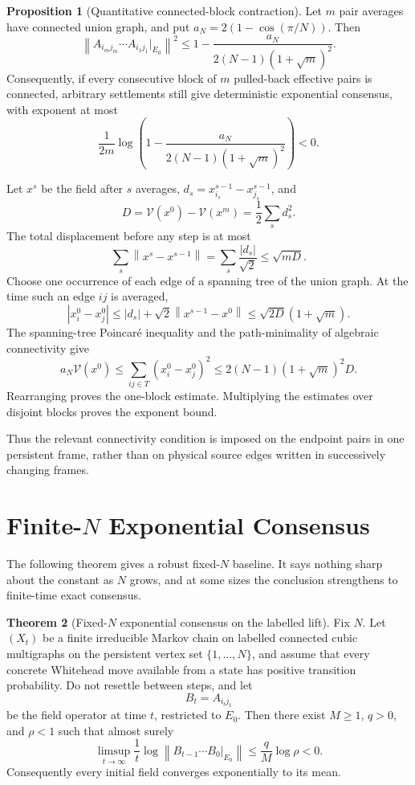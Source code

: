 \documentclass[11pt]{article}
\makeatletter
\newcommand{\V}{\mathcal V}
\newcommand{\norm}[1]{\left\|#1\right\|}
\theoremstyle{definition}
\newtheorem{theorem}{Theorem}
\newtheorem{proposition}[theorem]{Proposition}
\renewenvironment{proof}[1][\proofname]{\par
  \pushQED{\qed}%
  \normalfont \topsep6\p@\@plus6\p@\relax
  \trivlist
  \item[\hskip\labelsep\bfseries #1\@addpunct{.}]\ignorespaces
}{%
  \popQED\endtrivlist\@endpefalse
}
\makeatother
\begin{document}
\begin{proposition}[Quantitative connected-block contraction]
Let $m$ pair averages have connected union graph, and put
$a_N=2(1-\cos(\pi/N))$.  Then
\[
 \norm{A_{i_mj_m}\cdots A_{i_1j_1}|_{E_0}}^2
 \le
 1-\frac{a_N}{2(N-1)(1+\sqrt m)^2}.
\]
Consequently, if every consecutive block of $m$ pulled-back effective pairs
is connected, arbitrary settlements still give deterministic exponential
consensus, with exponent at most
\[
 \frac1{2m}\log\left(
 1-\frac{a_N}{2(N-1)(1+\sqrt m)^2}\right)<0.
\]
\end{proposition}

\begin{proof}
Let $x^s$ be the field after $s$ averages,
$d_s=x^{s-1}_{i_s}-x^{s-1}_{j_s}$, and
\[
 D=\V(x^0)-\V(x^m)=\frac12\sum_s d_s^2.
\]
The total displacement before any step is at most
\[
 \sum_s\norm{x^s-x^{s-1}}
 =\sum_s\frac{|d_s|}{\sqrt2}\le\sqrt{mD}.
\]
Choose one occurrence of each edge of a spanning tree of the union graph.
At the time such an edge $ij$ is averaged,
\[
 |x_i^0-x_j^0|
 \le |d_s|+\sqrt2\norm{x^{s-1}-x^0}
 \le\sqrt{2D}(1+\sqrt m).
\]
The spanning-tree Poincar\'e inequality and the path-minimality of algebraic
connectivity give
\[
 a_N\V(x^0)
 \le\sum_{ij\in T}(x_i^0-x_j^0)^2
 \le2(N-1)(1+\sqrt m)^2D.
\]
Rearranging proves the one-block estimate.  Multiplying the estimates over
disjoint blocks proves the exponent bound.
\end{proof}

Thus the relevant connectivity condition is imposed on the endpoint pairs
in one persistent frame, rather than on physical source edges written in
successively changing frames.

\section{\texorpdfstring{Finite-$N$}{Finite-N} Exponential Consensus}

The following theorem gives a robust fixed-$N$ baseline.  It says nothing sharp
about the constant as $N$ grows, and at some sizes the conclusion strengthens
to finite-time exact consensus.

\begin{theorem}[Fixed-$N$ exponential consensus on the labelled lift]
Fix $N$.  Let $(X_t)$ be a finite irreducible Markov chain on labelled connected
cubic multigraphs on the persistent vertex set $\{1,\ldots,N\}$, and assume
that every concrete Whitehead move available from a state has positive
transition probability.  Do not resettle between steps, and let
\[
    B_t=A_{i_tj_t}
\]
be the field operator at time $t$, restricted to $E_0$.  Then there
exist $M\ge1$, $q>0$, and $\rho<1$ such that almost surely
\[
    \limsup_{t\to\infty}
    \frac1t\log\norm{B_{t-1}\cdots B_0|_{E_0}}
    \le
    \frac{q}{M}\log\rho
    <0.
\]
Consequently every initial field converges exponentially to its mean.
\end{theorem}
\end{document}
